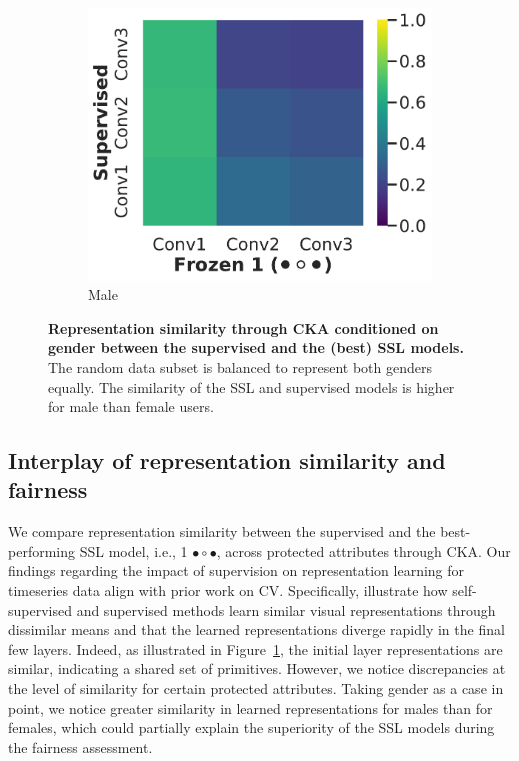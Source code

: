 \documentclass[letterpaper]{article} %
\begin{document}
\begin{figure}
\begin{subfigure}[]{0.35\linewidth}
    \includegraphics[trim={3cm 0.4cm 0 0},clip,width=\linewidth]{img/supervised-frozen1m-cka-male.pdf}
    \caption{Male}
\end{subfigure} %
\caption{\textbf{Representation similarity through CKA conditioned on gender between the supervised and the (best) SSL models.} The random data subset is balanced to represent both genders equally. The similarity of the SSL and supervised models is higher for male than female users.}
\label{ckaconditionedgender}
\end{figure}
\subsection{Interplay of representation similarity and fairness}\label{representation-evaluation}
We compare representation similarity between the supervised and the best-performing SSL model, i.e., 1 $\bullet\circ\bullet$, across protected attributes through CKA. Our findings regarding the impact of supervision on representation learning for timeseries data align with prior work on CV. Specifically, \citet{grigg2021self} illustrate how self-supervised and supervised methods learn similar visual representations through dissimilar means and that the learned representations diverge rapidly in the final few layers. Indeed, as illustrated in Figure~\ref{ckaconditionedgender}, the initial layer representations are similar, indicating a shared set of primitives. However, we notice discrepancies at the level of similarity for certain protected attributes. Taking gender as a case in point, we notice greater similarity in learned representations for males than for females, which could partially explain the superiority of the SSL models during the fairness assessment.
\end{document}
